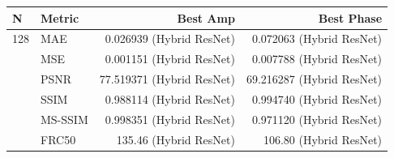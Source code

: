 \begin{tabular}{llrr}
\toprule
N & Metric & Best Amp & Best Phase \\
\midrule
128 & MAE & 0.026939 (Hybrid ResNet) & 0.072063 (Hybrid ResNet) \\
 & MSE & 0.001151 (Hybrid ResNet) & 0.007788 (Hybrid ResNet) \\
 & PSNR & 77.519371 (Hybrid ResNet) & 69.216287 (Hybrid ResNet) \\
 & SSIM & 0.988114 (Hybrid ResNet) & 0.994740 (Hybrid ResNet) \\
 & MS-SSIM & 0.998351 (Hybrid ResNet) & 0.971120 (Hybrid ResNet) \\
 & FRC50 & 135.46 (Hybrid ResNet) & 106.80 (Hybrid ResNet) \\
\bottomrule
\end{tabular}
